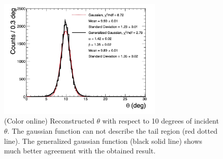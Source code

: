 \documentclass[jkps,preprint,fleqn,showpacs,showkeys]{revtex4}
\begin{document}
\begin{figure}[!hbt]
\includegraphics[width=0.7\textwidth]{figures/GG_fit.jpg}
\caption{ (Color online) Reconstructed $\theta$ with respect to 10 degrees of incident $\theta$. The gaussian function can not describe the tail region (red dotted line). The generalized gaussian function (black solid line) shows much better agreement with the obtained result.}
\label{fig:angle_10degree}
\end{figure}

\end{document}
